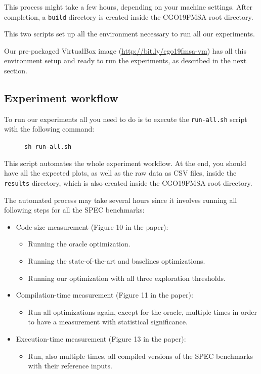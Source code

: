 {This process might take a few hours, depending on your machine settings.
After completion, a \texttt{build} directory is created inside the CGO19FMSA
root directory.

This two scripts set up all the environment necessary to run all our experiments.

Our pre-packaged VirtualBox image (\url{http://bit.ly/cgo19fmsa-vm})
has all this environment setup and ready to run the experiments, as described
in the next section.

\subsection{Experiment workflow}

To run our experiments all you need to do is to execute the \texttt{run-all.sh} script
with the following command:
\begin{figure}[h]
\texttt{sh run-all.sh}
\end{figure}

This script automates the whole experiment workflow.
At the end, you should have all the expected plots, as well as the raw data as CSV files,
inside the \texttt{results} directory, which is also created inside the CGO19FMSA
root directory.

The automated process may take several hours since it involves running all following steps for all the SPEC benchmarks:

\noindent{}
\begin{itemize}
  \item Code-size measurement (Figure 10 in the paper):
\begin{itemize}
  \item Running the oracle optimization.
  \item Running the state-of-the-art and baselines optimizations.
  \item Running our optimization with all three exploration thresholds.
\end{itemize}
  \item Compilation-time measurement (Figure 11 in the paper):
\begin{itemize}
  \item Run all optimizations again, except for the oracle, multiple times in order to have a measurement with statistical significance.
\end{itemize}
  \item Execution-time measurement (Figure 13 in the paper):
\begin{itemize}
  \item Run, also multiple times, all compiled versions of the SPEC benchmarks with their reference inputs.
\end{itemize}
\end{itemize}


}
